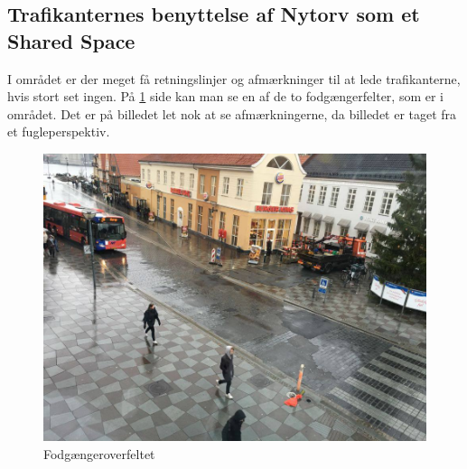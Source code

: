 \subsection{Trafikanternes benyttelse af Nytorv som et Shared Space}
\label{benyttelse_omrade}
I området er der meget få retningslinjer og afmærkninger til at lede trafikanterne, hvis stort set ingen. På \cref{fig:Fodfelt} side \pageref{fig:Fodfelt} kan man se en af de to fodgængerfelter, som er i området. Det er på billedet let nok at se afmærkningerne, da billedet er taget fra et fugleperspektiv.

\begin{figure}[htbp]
   \centering
   \begin{adjustbox}{max width=\textwidth}
     \includegraphics[scale=0.3]{figures/Billederogfigur/Fodfelt.jpg}
  \end{adjustbox}
   \caption{Fodgængeroverfeltet}
   \label{fig:Fodfelt}
 \end{figure}

